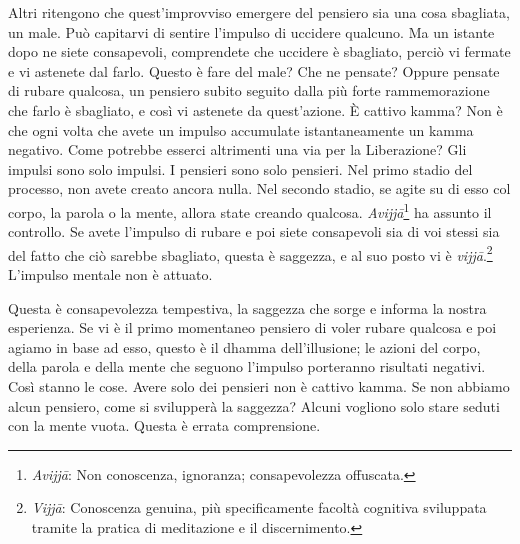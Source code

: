 Altri ritengono che quest'improvviso emergere del pensiero sia una cosa
sbagliata, un male. Può capitarvi di sentire l'impulso di uccidere
qualcuno. Ma un istante dopo ne siete consapevoli, comprendete che
uccidere è sbagliato, perciò vi fermate e vi astenete dal farlo. Questo
è fare del male? Che ne pensate? Oppure pensate di rubare qualcosa, un
pensiero subito seguito dalla più forte rammemorazione che farlo è
sbagliato, e così vi astenete da quest'azione. È cattivo kamma?
Non è che ogni volta che avete un impulso accumulate istantaneamente un
kamma negativo. Come potrebbe esserci altrimenti una via per la
Liberazione? Gli impulsi sono solo impulsi. I pensieri sono solo
pensieri. Nel primo stadio del processo, non avete creato ancora nulla.
Nel secondo stadio, se agite su di esso col corpo, la parola o la mente,
allora state creando qualcosa. \emph{Avijjā}\footnote{%
  \emph{Avijjā}: Non conoscenza, ignoranza; consapevolezza offuscata.}
ha assunto il
controllo. Se avete l'impulso di rubare e poi siete consapevoli sia di
voi stessi sia del fatto che ciò sarebbe sbagliato, questa è saggezza, e
al suo posto vi è \emph{vijjā}.\footnote{%
  \emph{Vijjā}: Conoscenza
  genuina, più specificamente facoltà cognitiva sviluppata tramite la
  pratica di meditazione e il discernimento.}
L'impulso mentale non è attuato.

Questa è consapevolezza tempestiva, la saggezza che sorge e informa la
nostra esperienza. Se vi è il primo momentaneo pensiero di voler rubare
qualcosa e poi agiamo in base ad esso, questo è il dhamma
dell'illusione; le azioni del corpo, della parola e della mente che
seguono l'impulso porteranno risultati negativi. Così stanno le cose.
Avere solo dei pensieri non è cattivo kamma. Se non abbiamo alcun
pensiero, come si svilupperà la saggezza? Alcuni vogliono solo stare
seduti con la mente vuota. Questa è errata comprensione.

